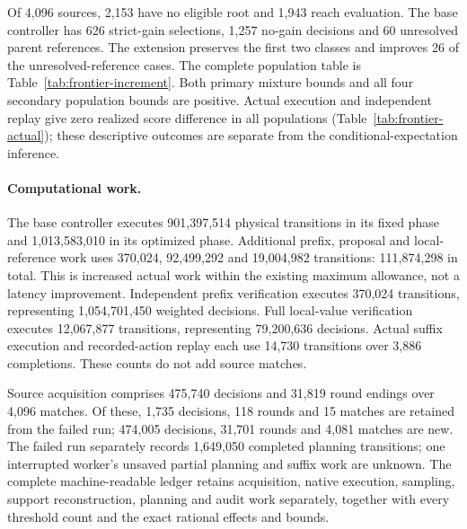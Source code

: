 Of 4,096 sources, 2,153 have no eligible root and 1,943 reach evaluation.
The base controller has 626 strict-gain selections, 1,257 no-gain decisions
and 60 unresolved parent references. The extension preserves the first two
classes and improves 26 of the unresolved-reference cases. The complete
population table is Table~\ref{tab:frontier-increment}. Both primary mixture
bounds and all four secondary population bounds are positive. Actual execution
and independent replay give zero realized score difference in all populations
(Table~\ref{tab:frontier-actual}); these descriptive outcomes are separate from
the conditional-expectation inference.

\begin{table}[htbp]
\centering\small

\caption{Realized terminal win-score differences on the retained actual deals,
in percentage points. These are descriptive paired outcomes, not the expected
increments in Table~\ref{tab:frontier-increment}.}
\label{tab:frontier-actual}
\end{table}

\paragraph{Computational work.}
The base controller executes 901,397,514 physical transitions in its fixed
phase and 1,013,583,010 in its optimized phase. Additional prefix, proposal and local-reference work
uses 370,024, 92,499,292 and 19,004,982 transitions: 111,874,298 in total.
This is increased actual work within the existing maximum allowance, not
a latency improvement. Independent prefix verification executes 370,024
transitions, representing 1,054,701,450 weighted decisions. Full local-value
verification executes 12,067,877 transitions, representing 79,200,636 decisions.
Actual suffix execution and recorded-action replay each use 14,730 transitions
over 3,886 completions. These counts do not add source matches.

Source acquisition comprises 475,740 decisions and 31,819 round endings over
4,096 matches. Of these, 1,735 decisions, 118 rounds and 15 matches are retained
from the failed run; 474,005 decisions, 31,701 rounds and 4,081 matches are new.
The failed run separately records 1,649,050 completed planning transitions;
one interrupted worker's unsaved partial planning and suffix work are unknown.
The complete machine-readable ledger
retains acquisition, native execution, sampling, support reconstruction,
planning and audit work separately, together with every threshold count and
the exact rational effects and bounds.
